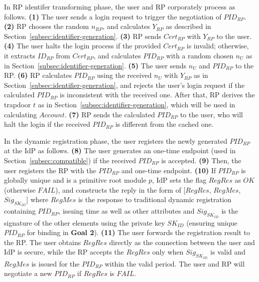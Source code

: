 In RP identifer transforming phase, the user and RP corporately process as follows. \textbf{(1)} The user sends a login request to trigger the negotiation of $PID_{RP}$. \textbf{(2)} RP chooses the random $n_{RP}$, and calculates $Y_{RP}$ as described in Section~\ref{subsec:identifier-generation}. \textbf{(3)} RP sends $Cert_{RP}$ with $Y_{RP}$ to the user.  \textbf{(4)} The user halts the login process if the provided $Cert_{RP}$ is invalid; otherwise, it extracts $ID_{RP}$ from $Cert_{RP}$, and calculates $PID_{RP}$ with a random chosen $n_U$ as in Section~\ref{subsec:identifier-generation}. \textbf{(5)} The user sends $n_U$ and $PID_{RP}$ to the RP. \textbf{(6)} RP calculates $PID_{RP}$ using the received $n_U$ with $Y_{RP}$ as in Section~\ref{subsec:identifier-generation}, and rejects the user's login request if the calculated $PID_{RP}$ is inconsistent with the received one. After that, RP derives the trapdoor $t$ as in Section~\ref{subsec:identifier-generation}, which will be used in calculating $Account$. \textbf{(7)} RP sends the calculated $PID_{RP}$ to the user, who will halt the login if the received $PID_{RP}$ is different from the cached one.

In the dynamic registration phase, the user registers the newly generated $PID_{RP}$ at the IdP as follows. \textbf{(8)} The user generates an one-time endpoint (used in Section~\ref{subsec:compatible}) if the received $PID_{RP}$ is accepted. \textbf{(9)} Then, the user registers the RP with the $PID_{RP}$ and one-time endpoint. \textbf{(10)} If $PID_{RP}$ is globally unique and is a primitive root module $p$, IdP sets the flag $RegRes$ as $OK$ (otherwise $FAIL$), and constructs the reply in the form of
[$RegRes$, $RegMes$, $Sig_{SK_{ID}}$]
where $RegMes$ is the response to traditional dynamic registration containing $PID_{RP}$, issuing time as well as other attributes and $Sig_{SK_{ID}}$ is the signature of the other elements using the private key $SK_{ID}$ (ensuring unique $PID_{RP}$ for binding in \textbf{Goal 2}). \textbf{(11)} The user forwards the registration result to the RP. The user obtains $RegRes$ directly as the connection between the user and IdP is secure, while the RP accepts the $RegRes$ only when $Sig_{SK_{ID}}$ is valid
and $RegMes$ is issued for the $PID_{RP}$ within the valid period. The user and RP will negotiate a new $PID_{RP}$ if $RegRes$ is $FAIL$.

